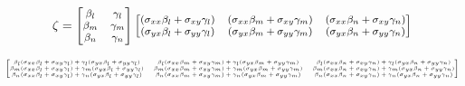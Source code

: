 \documentclass[
12pt,
a4paper,
oneside,
chapter=TITLE,
sumario=tradicional
]{abntex2}
\begin{document}
\begin{equation*}\footnotesize
	\zeta =
	\begin{bmatrix}
		\beta_l & \gamma_l\\
		\beta_m & \gamma_m\\
		\beta_n & \gamma_n
	\end{bmatrix}
	\begin{bmatrix}
		(\sigma_{xx}\beta_l+\sigma_{xy}\gamma_l) &
		(\sigma_{xx}\beta_m+\sigma_{xy}\gamma_m) &
		(\sigma_{xx}\beta_n+\sigma_{xy}\gamma_n)\\
		(\sigma_{yx}\beta_l+\sigma_{yy}\gamma_l) &
		(\sigma_{yx}\beta_m+\sigma_{yy}\gamma_m) &
		(\sigma_{yx}\beta_n+\sigma_{yy}\gamma_n)\\
	\end{bmatrix}
\end{equation*}






\begin{equation*}\tiny
    \begin{bmatrix}
		\beta_l(\sigma_{xx}\beta_l+\sigma_{xy}\gamma_l)+\gamma_l(\sigma_{yx}\beta_l+\sigma_{yy}\gamma_l) &
		\beta_l(\sigma_{xx}\beta_m+\sigma_{xy}\gamma_m)+\gamma_l(\sigma_{yx}\beta_m+\sigma_{yy}\gamma_m) &
		\beta_l(\sigma_{xx}\beta_n+\sigma_{xy}\gamma_n)+\gamma_l(\sigma_{yx}\beta_n+\sigma_{yy}\gamma_n) \\
		
		\beta_m(\sigma_{xx}\beta_l+\sigma_{xy}\gamma_l)+\gamma_m(\sigma_{yx}\beta_l+\sigma_{yy}\gamma_l) &
		\beta_m(\sigma_{xx}\beta_m+\sigma_{xy}\gamma_m)+\gamma_m(\sigma_{yx}\beta_m+\sigma_{yy}\gamma_m) &
		\beta_m(\sigma_{xx}\beta_n+\sigma_{xy}\gamma_n)+\gamma_m(\sigma_{yx}\beta_n+\sigma_{yy}\gamma_n) \\
		
		\beta_n(\sigma_{xx}\beta_l+\sigma_{xy}\gamma_l)+\gamma_n(\sigma_{yx}\beta_l+\sigma_{yy}\gamma_l) &
		\beta_n(\sigma_{xx}\beta_m+\sigma_{xy}\gamma_m)+\gamma_n(\sigma_{yx}\beta_m+\sigma_{yy}\gamma_m) &
		\beta_n(\sigma_{xx}\beta_n+\sigma_{xy}\gamma_n)+\gamma_n(\sigma_{yx}\beta_n+\sigma_{yy}\gamma_n) 
	\end{bmatrix}
\end{equation*}
\end{document}
